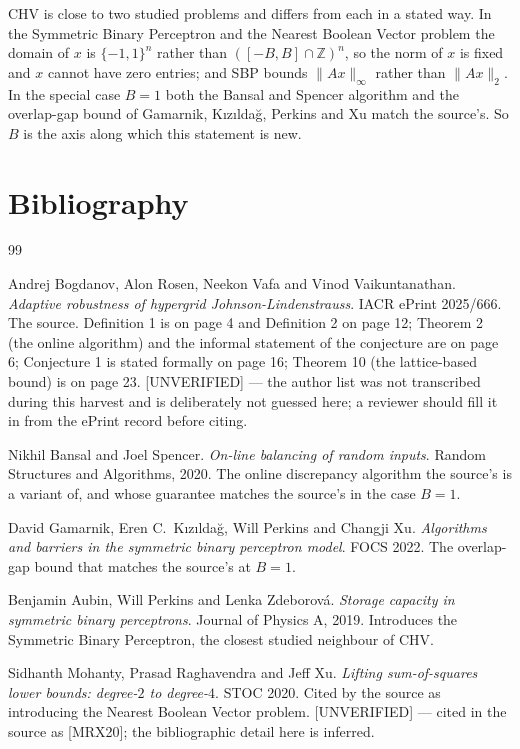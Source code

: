 \documentclass{aicr-conjecture}
\newcommand{\Z}{\mathbb{Z}}
\newcommand{\CHV}{\mathrm{CHV}}
\begin{document}
\begin{remark}\label{rem:neighbours}
$\CHV$ is close to two studied problems and differs from each in a stated
way. In the Symmetric Binary Perceptron and the Nearest Boolean Vector
problem the domain of $x$ is $\{-1,1\}^{n}$ rather than $([-B,B] \cap
\Z)^{n}$, so the norm of $x$ is fixed and $x$ cannot have zero entries;
and SBP bounds $\|Ax\|_{\infty}$ rather than $\|Ax\|_{2}$. In the special
case $B = 1$ both the Bansal and Spencer algorithm and the overlap-gap bound
of Gamarnik, K{\i}z{\i}lda\u{g}, Perkins and Xu match the source's. So
$B$ is the axis along which this statement is new.
\end{remark}

\section{Bibliography}

\begin{aicrbibliography}{99}

Andrej Bogdanov, Alon Rosen, Neekon Vafa and Vinod Vaikuntanathan.
\emph{Adaptive robustness of hypergrid Johnson-Lindenstrauss}.
IACR ePrint 2025/666.
The source. Definition 1 is on page 4 and Definition 2 on page 12;
Theorem 2 (the online algorithm) and the informal statement of the
conjecture are on page 6; Conjecture 1 is stated formally on page 16;
Theorem 10 (the lattice-based bound) is on page 23. [UNVERIFIED] --- the
author list was not transcribed during this harvest and is deliberately
not guessed here; a reviewer should fill it in from the ePrint record
before citing.

Nikhil Bansal and Joel Spencer.
\emph{On-line balancing of random inputs}.
Random Structures and Algorithms, 2020.
The online discrepancy algorithm the source's is a variant of, and whose
guarantee matches the source's in the case $B = 1$.

David Gamarnik, Eren C.\ K{\i}z{\i}lda\u{g}, Will Perkins and Changji Xu.
\emph{Algorithms and barriers in the symmetric binary perceptron model}.
FOCS 2022.
The overlap-gap bound that matches the source's at $B = 1$.

Benjamin Aubin, Will Perkins and Lenka Zdeborov\'a.
\emph{Storage capacity in symmetric binary perceptrons}.
Journal of Physics A, 2019.
Introduces the Symmetric Binary Perceptron, the closest studied
neighbour of $\CHV$.

Sidhanth Mohanty, Prasad Raghavendra and Jeff Xu.
\emph{Lifting sum-of-squares lower bounds: degree-$2$ to degree-$4$}.
STOC 2020.
Cited by the source as introducing the Nearest Boolean Vector problem.
[UNVERIFIED] --- cited in the source as [MRX20]; the bibliographic detail
here is inferred.

\end{aicrbibliography}
\end{document}
